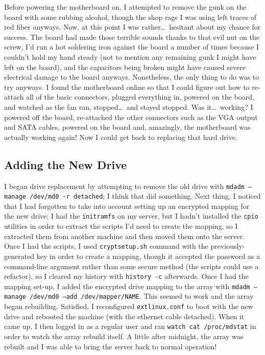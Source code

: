 \documentclass{article}
\begin{document}
Before powering the motherboard on, I attempted to remove the gunk on the board with some rubbing alcohol, though the shop rags I was using left traces of red fiber anyways.  Now, at this point I was rather\ldots~hesitant about my chance for success.  The board had made those terrible sounds thanks to that evil nut on the screw, I'd run a hot soldering iron against the board a number of times because I couldn't hold my hand steady (not to mention any remaining gunk I might have left on the board), and the capacitors being broken might have caused severe electrical damage to the board anyways.  Nonetheless, the only thing to do was to try anyways.  I found the motherboard  online so that I could figure out how to re-attach all of the basic connectors, plugged everything in, powered on the board, and watched as the fan ran, stopped\ldots~and stayed stopped.  Was it\ldots~working?  I powered off the board, re-attached the other connectors such as the VGA output and SATA cables, powered on the board and, amazingly, the motherboard was actually working again!  Now I could get back to replacing that hard drive.

\subsection{Adding the New Drive}
I began drive replacement by attempting to remove the old drive with \texttt{mdadm --manage /dev/md0 -r detached}; I think that did something.  Next thing, I noticed that I had forgotten to take into account setting up an encrypted mapping for the new drive; I had the \texttt{initramfs} on my server, but I hadn't installed the \texttt{cpio} utilities in order to extract the scripts I'd need to create the mapping, so I extracted them from another machine and then moved them onto the server.  Once I had the scripts, I used \texttt{cryptsetup.sh} command with the previously-generated key in order to create a mapping, though it accepted the password as a command-line argument rather than some secure method (the scripts could use a refactor), so I cleared my history with \texttt{history -c} afterwards.  Once I had the mapping set-up, I added the encrypted drive mapping to the array with \texttt{mdadm --manage /dev/md0 --add /dev/mapper/NAME}.  This seemed to work and the array began rebuilding.  Satisfied, I reconfigured \texttt{extlinux.conf} to boot with the new drive and rebooted the machine (with the ethernet cable detached).  When it came up, I then logged in as a regular user and ran \texttt{watch cat /proc/mdstat} in order to watch the array rebuild itself.  A little after midnight, the array was rebuilt and I was able to bring the server back to normal operation!
\end{document}
